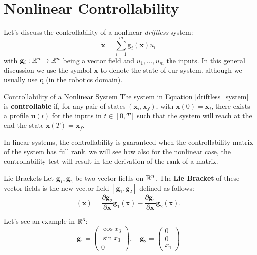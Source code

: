\documentclass[10pt, a4paper]{report}
\newcommand{\q}{{\mathbf q}}
\begin{document}
\section{Nonlinear Controllability}
Let's discuss the controllability of a nonlinear \textit{driftless} system:\begin{equation}\label{driftless_system}
    \dot{\mathbf x}=\sum_{i=1}^m\mathbf g_i(\mathbf x)u_i 
\end{equation}
with $\mathbf g_i:{\mathbb R}^n\rightarrow{\mathbb R}^n$ being a vector field and $u_1,\dots,u_m$ the inputs. In this general discussion we use the symbol $\mathbf x$ to denote the state of our system, although we usually use $\q$ (in the robotics domain).
\begin{boxdefinition}{Controllability of a Nonlinear System}{}
    The system in Equation \eqref{driftless_system} is \textbf{controllable} if, for any pair of states $(\mathbf x_i,\mathbf x_f)$, with $\mathbf x(0)=\mathbf x_i$, there exists a profile $\mathbf u(t)$ for the inputs in $t\in [0,T]$ such that the system will reach at the end the state $\mathbf x(T)=\mathbf x_f$.
\end{boxdefinition} 
In linear systems, the controllability is guaranteed when the controllability matrix of the system has full rank, we will see how also for the nonlinear case, the controllability test will result in the derivation of the rank of a matrix.
\begin{boxdefinition}{Lie Brackets}{}
    Let $\mathbf g_1,\mathbf g_2$ be two vector fields on ${\mathbb R}^n$. The \textbf{Lie Bracket} of these vector fields is the new vector field $[\mathbf g_1,\mathbf g_2]$ defined as follows:\begin{equation}
        [\mathbf g_1,\mathbf g_2](\mathbf x)=\frac{\partial \mathbf g_2}{\partial \mathbf x}\mathbf g_1(\mathbf x)-\frac{\partial \mathbf g_1}{\partial \mathbf x}\mathbf g_2(\mathbf x).
    \end{equation}
\end{boxdefinition}
\noindent Let's see an example in ${\mathbb R}^3$:\begin{equation}
    \mathbf g_1=\begin{pmatrix}
        \cos x_3\\\sin x_3\\ 0 
    \end{pmatrix},\quad\mathbf g_2=\begin{pmatrix}
        0\\0\\ x_1 
    \end{pmatrix}
\end{equation}
\end{document}
